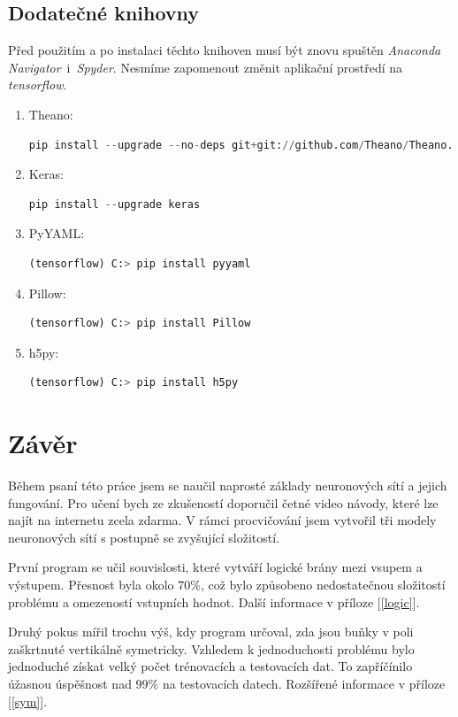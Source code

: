\documentclass[12pt,a4paper]{report}
\begin{document}
\section{Dodatečné knihovny}
Před použitím a po instalaci těchto knihoven musí být znovu spuštěn \textit{Anaconda Navigator}~i~\textit{Spyder}. Nesmíme zapomenout změnit aplikační prostředí na \textit{tensorflow}.
\begin{enumerate}
	\item Theano:
	\begin{lstlisting}[language=Python]
pip install --upgrade --no-deps git+git://github.com/Theano/Theano.git
	\end{lstlisting}
	\item Keras:
	\begin{lstlisting}[language=Python]
pip install --upgrade keras
	\end{lstlisting}
	\item PyYAML:
	\begin{lstlisting}[language=Python]
(tensorflow) C:> pip install pyyaml
	\end{lstlisting}
	\item Pillow:
	\begin{lstlisting}[language=Python]
(tensorflow) C:> pip install Pillow
	\end{lstlisting}
	\item h5py:
	\begin{lstlisting}[language=Python]
(tensorflow) C:> pip install h5py
	\end{lstlisting}
\end{enumerate}
	
	
\chapter{Závěr}
Během psaní této práce jsem se naučil naprosté základy neuronových sítí a jejich fungování. Pro učení bych ze zkušeností doporučil četné video návody, které lze najít na internetu zcela zdarma. V rámci procvičování jsem vytvořil tři modely neuronových sítí s postupně se zvyšující složitostí.

První program se učil souvislosti, které vytváří logické brány mezi vsupem a výstupem. Přesnost byla okolo $70\%$, což bylo způsobeno nedostatečnou složitostí problému a omezeností vstupních hodnot. Další informace v příloze [\ref{logic}].

Druhý pokus mířil trochu výš, kdy program určoval, zda jsou buňky v poli zaškrtnuté vertikálně symetricky. Vzhledem k jednoduchosti problému bylo jednoduché získat velký počet trénovacích a testovacích dat. To zapříčínilo úžasnou úspěšnost nad $99\%$ na testovacích datech. Rozšířené informace v příloze [\ref{sym}].
\end{document}
